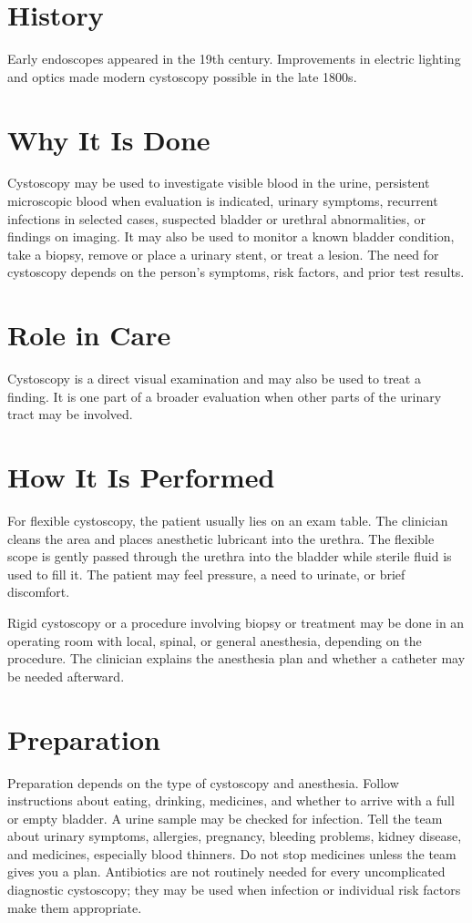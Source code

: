 \section*{History}
Early endoscopes appeared in the 19th century. Improvements in electric lighting and optics made modern cystoscopy possible in the late 1800s.

\section*{Why It Is Done}
Cystoscopy may be used to investigate visible blood in the urine, persistent microscopic blood when evaluation is indicated, urinary symptoms, recurrent infections in selected cases, suspected bladder or urethral abnormalities, or findings on imaging. It may also be used to monitor a known bladder condition, take a biopsy, remove or place a urinary stent, or treat a lesion. The need for cystoscopy depends on the person's symptoms, risk factors, and prior test results.

\section*{Role in Care}
Cystoscopy is a direct visual examination and may also be used to treat a finding. It is one part of a broader evaluation when other parts of the urinary tract may be involved.

\section*{How It Is Performed}
For flexible cystoscopy, the patient usually lies on an exam table. The clinician cleans the area and places anesthetic lubricant into the urethra. The flexible scope is gently passed through the urethra into the bladder while sterile fluid is used to fill it. The patient may feel pressure, a need to urinate, or brief discomfort.

Rigid cystoscopy or a procedure involving biopsy or treatment may be done in an operating room with local, spinal, or general anesthesia, depending on the procedure. The clinician explains the anesthesia plan and whether a catheter may be needed afterward.

\section*{Preparation}
Preparation depends on the type of cystoscopy and anesthesia. Follow instructions about eating, drinking, medicines, and whether to arrive with a full or empty bladder. A urine sample may be checked for infection. Tell the team about urinary symptoms, allergies, pregnancy, bleeding problems, kidney disease, and medicines, especially blood thinners. Do not stop medicines unless the team gives you a plan. Antibiotics are not routinely needed for every uncomplicated diagnostic cystoscopy; they may be used when infection or individual risk factors make them appropriate.

